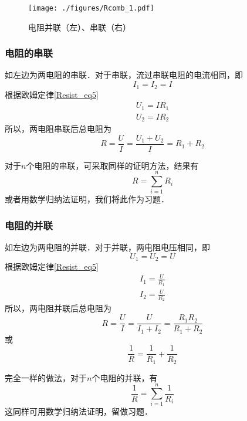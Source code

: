 
\begin{figure}[ht]
\centering
\texttt{[image: ./figures/Rcomb\_1.pdf]}
\caption{电阻并联（左）、串联（右）} \label{Rcomb_fig1}
\end{figure}
\subsubsection{电阻的串联}
如左边为两电阻的串联．对于串联，流过串联电阻的电流相同，即
\begin{equation}
I_1=I_2=I
\end{equation}
根据欧姆定律\autoref{Resist_eq5}~
\begin{equation}
\begin{aligned}
U_1=IR_1\\
U_2=IR_2
\end{aligned}
\end{equation}
所以，两电阻串联后总电阻为
\begin{equation}
R = \frac{U}{I}=\frac{U_1+U_2}{I} = {R_1 + R_2}
\end{equation}

对于$n$个电阻的串联，可采取同样的证明方法，结果有
\begin{equation}
R=\sum_{i=1}^{n}R_i
\end{equation}
或者用数学归纳法证明，我们将此作为习题．
\subsubsection{电阻的并联}
如左边为两电阻的并联．对于并联，两电阻电压相同，即
\begin{equation}
U_1=U_2=U
\end{equation}
根据欧姆定律\autoref{Resist_eq5}~
\begin{equation}
\begin{aligned}
I_1=\frac{U}{R_1}\\
I_2=\frac{U}{R_2}
\end{aligned}
\end{equation}
所以，两电阻并联后总电阻为
\begin{equation}
R = \frac{U}{I}=\frac{U}{I_1+I_2} =\frac{R_1R_2} {R_1 + R_2}
\end{equation}
或
\begin{equation}
\frac{1}{R} = \frac{1} {R_1}+\frac{1}{R_2}
\end{equation}

完全一样的做法，对于$n$个电阻的并联，有
\begin{equation}
\frac{1}{R}=\sum_{i=1}^{n}\frac{1}{R_i}
\end{equation}
这同样可用数学归纳法证明，留做习题．
